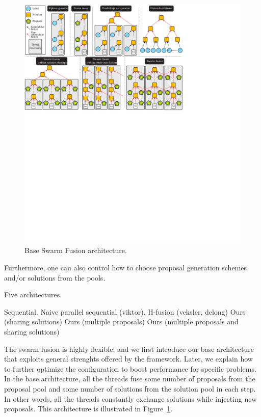 \begin{figure}[tb]
 \includegraphics[width=\columnwidth]{figure/model.pdf}
 \caption{Base Swarm Fusion architecture.}\label{fig:model}
\end{figure}

%
Furthermore, one can also control how to choose proposal generation
schemes and/or solutions from the pools.



Five architectures.

Sequential.
Naive parallel sequential (viktor).
H-fusion (veksler, delong)
Ours (sharing solutions)
Ours (multiple proposals)
Ours (multiple proposals and sharing solutions)





The swarm fusion is highly flexible, and we first introduce our base
architecture that exploits general strenghts offered by the
framework. Later, we explain how to further optimize the configuration
to boost performance for specific problems. In the base architecture,
all the threads fuse some number of proposals from the proposal pool and
some number of solutions from the solution pool in each step. In other
words, all the threads constantly exchange solutions while injecting new
proposals. This architecture is illustrated in Figure~\ref{fig:model}.


